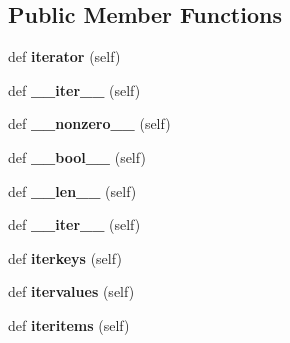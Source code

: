 \subsection*{Public Member Functions}
\begin{DoxyCompactItemize}
\item 
\mbox{\label{classtttrlib_1_1map__string__string_a9683072f0f530b5d31bb1724666b229c}} 
def {\bfseries iterator} (self)
\item 
\mbox{\label{classtttrlib_1_1map__string__string_a5f6ff2421f2af68a951f215d9d8f2417}} 
def {\bfseries \+\_\+\+\_\+iter\+\_\+\+\_\+} (self)
\item 
\mbox{\label{classtttrlib_1_1map__string__string_a4e04f5aff990f2a9d0558280db0514f0}} 
def {\bfseries \+\_\+\+\_\+nonzero\+\_\+\+\_\+} (self)
\item 
\mbox{\label{classtttrlib_1_1map__string__string_a69fc327d9926a4c035d3526670f65c04}} 
def {\bfseries \+\_\+\+\_\+bool\+\_\+\+\_\+} (self)
\item 
\mbox{\label{classtttrlib_1_1map__string__string_a45642770610509bdac2e1280ad10c3f6}} 
def {\bfseries \+\_\+\+\_\+len\+\_\+\+\_\+} (self)
\item 
\mbox{\label{classtttrlib_1_1map__string__string_a5f6ff2421f2af68a951f215d9d8f2417}} 
def {\bfseries \+\_\+\+\_\+iter\+\_\+\+\_\+} (self)
\item 
\mbox{\label{classtttrlib_1_1map__string__string_a3cc3a0cf17ff8594bebd4b9c51389a82}} 
def {\bfseries iterkeys} (self)
\item 
\mbox{\label{classtttrlib_1_1map__string__string_af7102bba7b3d0f4828cebb616b6949de}} 
def {\bfseries itervalues} (self)
\item 
\mbox{\label{classtttrlib_1_1map__string__string_a73f52b0a1f6044809a0d327959b092f3}} 
def {\bfseries iteritems} (self)

\end{DoxyCompactItemize}
